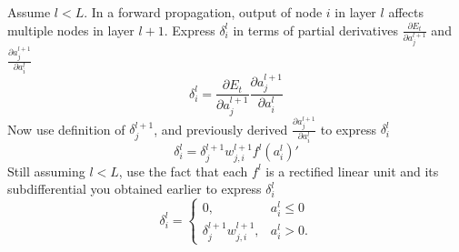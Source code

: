 \documentclass{article}
\begin{document}
Assume $l<L$.  In a forward propagation, output of node $i$ in layer $l$ affects multiple nodes in layer $l+1$.
Express $\delta^l_i$ in terms of partial derivatives $\frac{\partial E_t}{\partial a^{l+1}_j}$ and $\frac{\partial a^{l+1}_j}{\partial a^l_i}$
\[
\delta^l_i = \frac{\partial E_t}{\partial a^{l+1}_j} \frac{\partial a^{l+1}_j}{\partial a^l_i}
\]
Now use definition of $\delta^{l+1}_j$, and previously derived $\frac{\partial a^{l+1}_j}{\partial a^l_i}$ to express $\delta^l_i$
\[
\delta^l_i = \delta^{l+1}_j w^{l+1}_{j,i} f^l(a^l_i)'
\]
\newproblem{1pt}
Still assuming $l<L$, use the fact that each $f^l$ is a rectified linear unit and its subdifferential you obtained earlier  to express $\delta^l_i$
\[
\delta^l_i = \begin{cases}
0,&a^l_i \leq 0 \\
\delta^{l+1}_j w^{l+1}_{j,i},&a^l_i > 0. \end{cases}
\]
\end{document}
